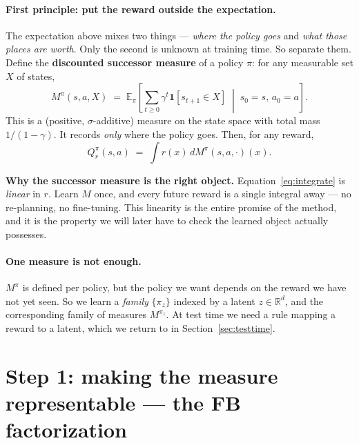 \documentclass[11pt]{article}
\newcommand{\E}{\mathbb{E}}
\newcommand{\ind}[1]{\mathbf{1}\!\left[#1\right]}
\begin{document}
\paragraph{First principle: put the reward outside the expectation.} The
expectation above mixes two things --- \emph{where the policy goes} and \emph{what
those places are worth}. Only the second is unknown at training time. So separate
them. Define the \textbf{discounted successor measure} of a policy $\pi$: for any
measurable set $X$ of states,
\begin{equation}
\label{eq:sm}
M^{\pi}(s,a,X) \;=\; \E_\pi\!\left[\sum_{t\ge0}\gamma^t \ind{s_{t+1}\in X}\;\middle|\;s_0=s,\,a_0=a\right].
\end{equation}
This is a (positive, $\sigma$-additive) measure on the state space with total mass
$1/(1-\gamma)$. It records \emph{only} where the policy goes. Then, for any reward,
\begin{equation}
\label{eq:integrate}
Q_r^\pi(s,a) \;=\; \int r(x)\, dM^{\pi}(s,a,\cdot)(x).
\end{equation}

\begin{keybox}
\textbf{Why the successor measure is the right object.}
Equation~\eqref{eq:integrate} is \emph{linear} in $r$. Learn $M$ once, and every
future reward is a single integral away --- no re-planning, no fine-tuning. This
linearity is the entire promise of the method, and it is the property we will
later have to check the learned object actually possesses.
\end{keybox}

\paragraph{One measure is not enough.} $M^\pi$ is defined per policy, but the
policy we want depends on the reward we have not yet seen. So we learn a
\emph{family} $\{\pi_z\}$ indexed by a latent $z\in\mathbb{R}^d$, and the
corresponding family of measures $M^{\pi_z}$. At test time we need a rule mapping
a reward to a latent, which we return to in Section~\ref{sec:testtime}.

\section{Step 1: making the measure representable --- the FB factorization}
\end{document}
